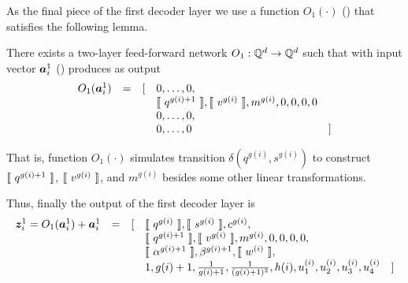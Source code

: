 As the final piece of the first decoder layer 
we use a function $O_1(\cdot)$ () that satisfies the following lemma.
\begin{lemma}\label{lem:M}
There exists a two-layer feed-forward network $O_1:\mathbb{Q}^d\to\mathbb{Q}^d$ such that with input vector ${\bm{a}}^1_{i}$ () produces as output
\begin{equation*}
\begin{array}{rcllr}
O_1({\bm{a}}^1_i) & = & [ 
& 0,\ldots,0, \\
&&& \llbracket\ q^{g(i)+1}\ \rrbracket,\llbracket\ v^{g(i)}\ \rrbracket,m^{g(i)},0,0,0,0 \\
&&& 0,\ldots,0, \\
&&& 0,\ldots,0 & ] 
\end{array}
\end{equation*}
\end{lemma}
That is, function $O_1(\cdot)$ simulates transition $\delta(q^{g(i)},s^{g(i)})$ 
to construct $\llbracket\ q^{g(i)+1}\ \rrbracket$, $\llbracket\ v^{g(i)}\ \rrbracket$, and $m^{g(i)}$
besides some other linear transformations.

Thus, finally the output of the first decoder layer is
\begin{equation*}
\begin{array}{rcllr}
{\bm{z}}^1_i = O_1({\bm{a}}^1_i) + {\bm{a}}^1_i & = & [ 
& \llbracket\ q^{g(i)}\ \rrbracket,\llbracket\ s^{g(i)}\ \rrbracket,c^{g(i)}, \\
&&& \llbracket\ q^{g(i)+1}\ \rrbracket,\llbracket\ v^{g(i)}\ \rrbracket,m^{g(i)},0,0,0,0, \\
&&& \llbracket\ \alpha^{g(i)+1}\ \rrbracket,\beta^{g(i)+1},\llbracket\ w^{(i)}\ \rrbracket, \\
&&& 1,g(i)+1,\frac{1}{g(i)+1},\frac{1}{(g(i)+1)^2},h(i),u_1^{(i)},u_2^{(i)},u_3^{(i)},u_4^{(i)} & ] 
\end{array}
\end{equation*}


